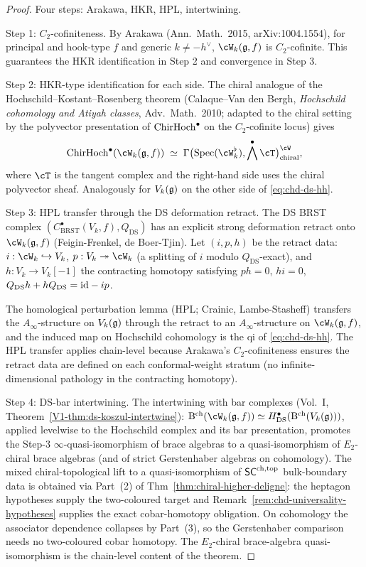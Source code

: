 \begin{proof}
Four steps: Arakawa, HKR, HPL, intertwining.

Step 1: $C_2$-cofiniteness. By Arakawa (Ann.\ Math.\ 2015,
arXiv:1004.1554), for principal and hook-type $f$ and generic
$k \ne -h^\vee$, $\cW_k(\fg, f)$ is $C_2$-cofinite. This guarantees
the HKR identification in Step 2 and convergence in Step 3.

Step 2: HKR-type identification for each side. The chiral analogue
of the Hochschild--Kostant--Rosenberg theorem (Calaque--Van den Bergh,
\emph{Hochschild cohomology and Atiyah classes}, Adv.~Math.\ 2010;
adapted to the chiral setting by the polyvector presentation of
$\mathrm{ChirHoch}^\bullet$ on the $C_2$-cofinite locus) gives
\[
 \ChirHoch^\bullet(\cW_k(\fg, f)) \;\simeq\;
 \Gamma\bigl(\operatorname{Spec}(\cW_k^\flat), \bigwedge^\bullet \cT\bigr)^{\cW}_{\mathrm{chiral}},
\]
where $\cT$ is the tangent complex and the right-hand side uses the
chiral polyvector sheaf. Analogously for $V_k(\mathfrak{g})$ on the other side
of \eqref{eq:chd-ds-hh}.

Step 3: HPL transfer through the DS deformation retract. The DS BRST
complex $(C^\bullet_{\mathrm{BRST}}(V_k, f), Q_{\mathrm{DS}})$ has an
explicit strong deformation retract onto $\cW_k(\fg, f)$
(Feigin-Frenkel, de Boer-Tjin). Let $(i, p, h)$ be the retract data:
$i : \cW_k \hookrightarrow V_k$, $p: V_k \twoheadrightarrow \cW_k$
(a splitting of $i$ modulo $Q_{\mathrm{DS}}$-exact), and
$h: V_k \to V_k[-1]$ the contracting homotopy satisfying
$ph = 0$, $hi = 0$, $Q_{\mathrm{DS}}h + hQ_{\mathrm{DS}} = \mathrm{id} - ip$.

The homological perturbation lemma (HPL; Crainic, Lambe-Stasheff)
transfers the $A_\infty$-structure on $V_k(\mathfrak{g})$ through the retract to
an $A_\infty$-structure on $\cW_k(\fg, f)$, and the induced map on
Hochschild cohomology is the qi of \eqref{eq:chd-ds-hh}. The HPL
transfer applies chain-level because Arakawa's $C_2$-cofiniteness
ensures the retract data are defined on each conformal-weight stratum
(no infinite-dimensional pathology in the contracting homotopy).

Step 4: DS-bar intertwining. The intertwining with bar complexes
(Vol.~I, Theorem~\ref*{V1-thm:ds-koszul-intertwine}):
$\Barch(\cW_k(\fg, f)) \simeq H^\bullet_{\mathrm{DS}}(\Barch(V_k(\fg)))$,
applied levelwise to the Hochschild complex and its bar presentation,
promotes the Step-3 $\infty$-quasi-isomorphism of brace algebras to
a quasi-isomorphism of $E_2$-chiral brace algebras (and of strict
Gerstenhaber algebras on cohomology). The mixed chiral-topological lift
to a quasi-isomorphism of $\mathsf{SC}^{\mathrm{ch},\mathrm{top}}$ bulk-boundary data is obtained via
Part~(2) of Thm~\ref{thm:chiral-higher-deligne}: the heptagon
hypotheses supply the two-coloured target and
Remark~\ref{rem:chd-universality-hypotheses} supplies the exact
cobar-homotopy obligation. On cohomology the associator dependence
collapses by Part~(3), so the Gerstenhaber comparison needs no
two-coloured cobar homotopy. The $E_2$-chiral brace-algebra
quasi-isomorphism is the chain-level content of the theorem.


\end{proof}

